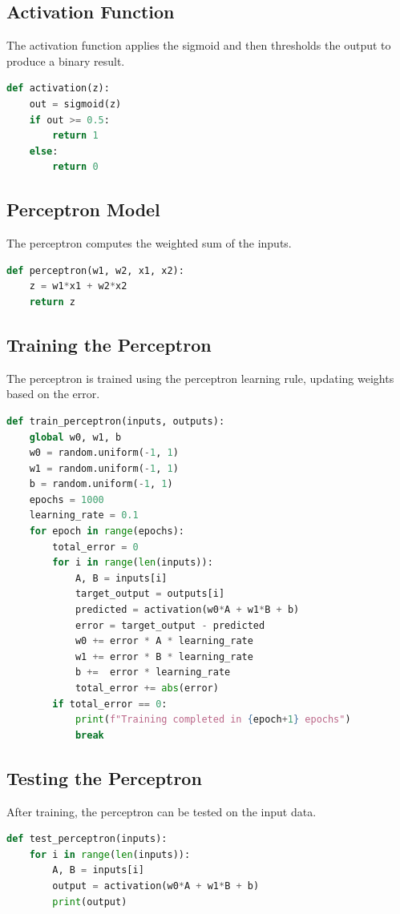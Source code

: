 \documentclass[a4paper, journal]{IEEEtran}
\begin{document}
\subsection{Activation Function}
The activation function applies the sigmoid and then thresholds the output to produce a binary result.
\begin{lstlisting}[language=Python, caption=Activation Function]
def activation(z):
    out = sigmoid(z)
    if out >= 0.5:
        return 1
    else:
        return 0
\end{lstlisting}

\subsection{Perceptron Model}
The perceptron computes the weighted sum of the inputs.
\begin{lstlisting}[language=Python, caption=Perceptron Model]
def perceptron(w1, w2, x1, x2):
    z = w1*x1 + w2*x2
    return z
\end{lstlisting}

\subsection{Training the Perceptron}
The perceptron is trained using the perceptron learning rule, updating weights based on the error.
\begin{lstlisting}[language=Python, caption=Training Loop]
def train_perceptron(inputs, outputs):
    global w0, w1, b 
    w0 = random.uniform(-1, 1)
    w1 = random.uniform(-1, 1)
    b = random.uniform(-1, 1)
    epochs = 1000
    learning_rate = 0.1
    for epoch in range(epochs):
        total_error = 0
        for i in range(len(inputs)):
            A, B = inputs[i]
            target_output = outputs[i]
            predicted = activation(w0*A + w1*B + b)
            error = target_output - predicted
            w0 += error * A * learning_rate
            w1 += error * B * learning_rate
            b +=  error * learning_rate
            total_error += abs(error)
        if total_error == 0:
            print(f"Training completed in {epoch+1} epochs")
            break
\end{lstlisting}

\subsection{Testing the Perceptron}
After training, the perceptron can be tested on the input data.
\begin{lstlisting}[language=Python, caption=Testing the Perceptron]
def test_perceptron(inputs):
    for i in range(len(inputs)):
        A, B = inputs[i]
        output = activation(w0*A + w1*B + b)
        print(output)
\end{lstlisting}
\end{document}
